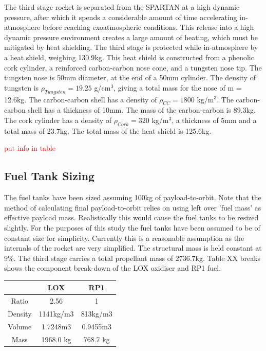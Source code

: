 The third stage rocket is separated from the SPARTAN at a high dynamic pressure, after which it spends a considerable amount of time accelerating in-atmosphere before reaching exoatmospheric conditions. This release into a high dynamic pressure environment creates a large amount of heating, which must be mitigated by heat shielding. 
The third stage is protected while in-atmosphere by a heat shield, weighing 130.9kg. This heat shield is constructed from a phenolic cork cylinder, a reinforced carbon-carbon nose cone, and a tungsten nose tip. 
The tungsten nose is 50mm diameter, at the end of a 50mm cylinder. The density of tungsten is $\rho_{Tungsten} = 19.25$  g/cm$^3$, giving a total mass for the nose of m = 12.6kg.
The carbon-carbon shell has a density of $\rho_{CC} = 1800$  kg/m$^3$. The carbon-carbon shell has a thickness of 10mm. The mass of the carbon-carbon is 89.3kg. 
The cork cylinder has a density of $\rho_{Cork} = 320$  kg/m$^3$, a thickness of 5mm and a total mass of 23.7kg. 
The total mass of the heat shield is 125.6kg.

\textcolor{red}{put info in table}
		
		\subsection{Fuel Tank Sizing}
		The fuel tanks have been sized assuming 100kg of payload-to-orbit. Note that the method of calculating final payload-to-orbit relies on using left over 'fuel mass' as effective payload mass. Realistically this would cause the fuel tanks to be resized slightly. For the purposes of this study the fuel tanks have been assumed to be of constant size for simplicity. Currently this is a reasonable assumption as the internals of the rocket are very simplified. The structural mass is held constant at 9\%. The third stage carries a total propellant mass of 2736.7kg. Table XX breaks shows the component break-down of the LOX oxidiser and RP1 fuel.  
		
\begin{tabular}{|c|c|c|}
	\hline  & \textbf{LOX} & \textbf{RP1} \\ 
	\hline Ratio & 2.56 & 1 \\ 
	\hline Density & 1141kg/m3 & 813kg/m3 \cite{Magee}\\ 
	\hline Volume & 1.7248m3 & 0.9455m3 \\ 
	\hline Mass & 1968.0 kg & 768.7 kg \\ 
	\hline 
\end{tabular} 
		

